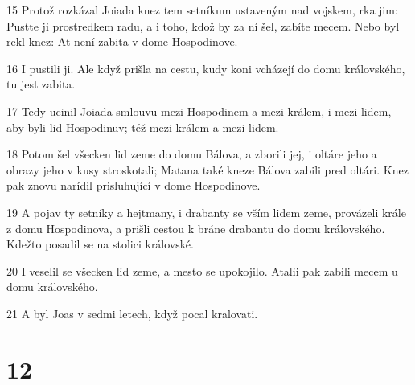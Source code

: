 \par 15 Protož rozkázal Joiada knez tem setníkum ustaveným nad vojskem, rka jim: Pustte ji prostredkem radu, a i toho, kdož by za ní šel, zabíte mecem. Nebo byl rekl knez: At není zabita v dome Hospodinove.
\par 16 I pustili ji. Ale když prišla na cestu, kudy koni vcházejí do domu královského, tu jest zabita.
\par 17 Tedy ucinil Joiada smlouvu mezi Hospodinem a mezi králem, i mezi lidem, aby byli lid Hospodinuv; též mezi králem a mezi lidem.
\par 18 Potom šel všecken lid zeme do domu Bálova, a zborili jej, i oltáre jeho a obrazy jeho v kusy stroskotali; Matana také kneze Bálova zabili pred oltári. Knez pak znovu narídil prisluhující v dome Hospodinove.
\par 19 A pojav ty setníky a hejtmany, i drabanty se vším lidem zeme, provázeli krále z domu Hospodinova, a prišli cestou k bráne drabantu do domu královského. Kdežto posadil se na stolici královské.
\par 20 I veselil se všecken lid zeme, a mesto se upokojilo. Atalii pak zabili mecem u domu královského.
\par 21 A byl Joas v sedmi letech, když pocal kralovati.

\chapter{12}

